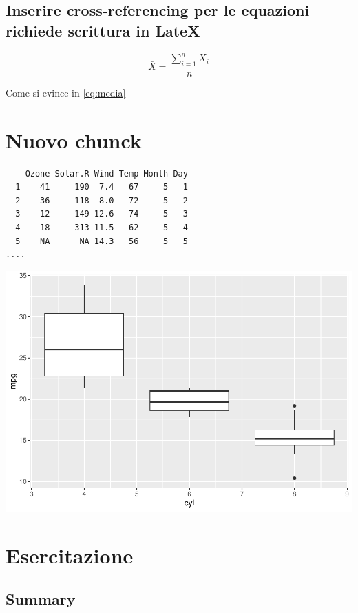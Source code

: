 \documentclass[
]{article}
\begin{document}
\hypertarget{inserire-cross-referencing-per-le-equazioni-richiede-scrittura-in-latex}{%
\subsection{Inserire cross-referencing per le equazioni richiede scrittura in LateX}\label{inserire-cross-referencing-per-le-equazioni-richiede-scrittura-in-latex}}

\begin{equation}
\bar{X} = \frac{\sum_{i=1}^n X_i}{n} \label{eq:media}
\end{equation}

Come si evince in \eqref{eq:media}

\newpage

\hypertarget{nuovo-chunck}{%
\section{Nuovo chunck}\label{nuovo-chunck}}

\begin{verbatim}
    Ozone Solar.R Wind Temp Month Day
  1    41     190  7.4   67     5   1
  2    36     118  8.0   72     5   2
  3    12     149 12.6   74     5   3
  4    18     313 11.5   62     5   4
  5    NA      NA 14.3   56     5   5
....
\end{verbatim}

\begin{center}\includegraphics[width=0.5\linewidth]{Airquality2_files/figure-latex/unnamed-chunk-3-1} \end{center}

\hypertarget{esercitazione}{%
\section{Esercitazione}\label{esercitazione}}

\hypertarget{summary}{%
\subsection{Summary}\label{summary}}
\end{document}
